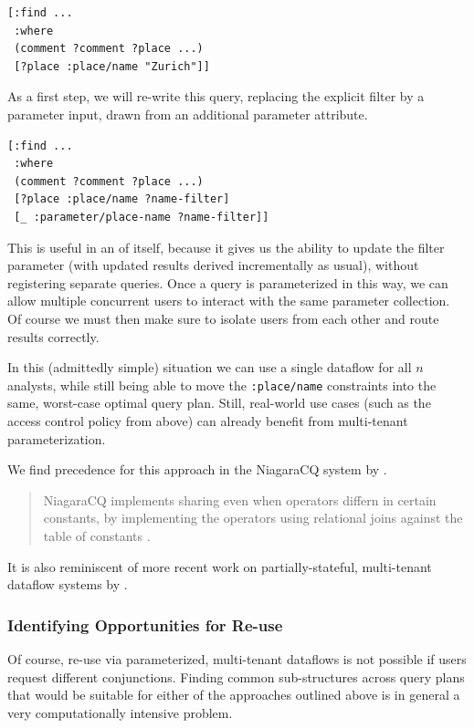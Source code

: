 \documentclass[../catalog.tex]{subfiles}
\begin{document}
\begin{verbatim}
[:find ...
 :where
 (comment ?comment ?place ...)
 [?place :place/name "Zurich"]]
\end{verbatim}

As a first step, we will re-write this query, replacing the explicit
filter by a parameter input, drawn from an additional parameter
attribute.

\begin{verbatim}
[:find ...
 :where
 (comment ?comment ?place ...)
 [?place :place/name ?name-filter]
 [_ :parameter/place-name ?name-filter]]
\end{verbatim}

This is useful in an of itself, because it gives us the ability to
update the filter parameter (with updated results derived
incrementally as usual), without registering separate queries. Once a
query is parameterized in this way, we can allow multiple concurrent
users to interact with the same parameter collection. Of course we
must then make sure to isolate users from each other and route results
correctly.

In this (admittedly simple) situation we can use a single dataflow for
all $n$ analysts, while still being able to move the
\texttt{:place/name} constraints into the same, worst-case optimal
query plan. Still, real-world use cases (such as the access control
policy from above) can already benefit from multi-tenant
parameterization.

We find precedence for this approach in the NiagaraCQ system by
\cite{chen2000niagaracq}.

\begin{quote}
NiagaraCQ implements sharing even when operators differn in certain
constants, by implementing the operators using relational joins
against the table of constants \cite{chen2000niagaracq}.

\cite{hirzel2014catalog}
\end{quote}

It is also reminiscent of more recent work on partially-stateful,
multi-tenant dataflow systems by \cite{gjengset2018noria}.

\subsubsection{Identifying Opportunities for Re-use}

Of course, re-use via parameterized, multi-tenant dataflows is not
possible if users request different conjunctions. Finding common
sub-structures across query plans that would be suitable for either of
the approaches outlined above is in general a very computationally
intensive problem.
\end{document}
